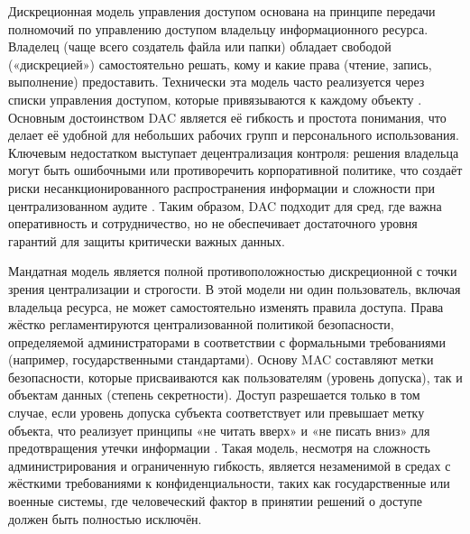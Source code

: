 \documentclass{SibFU-docs}
\begin{document}

Дискреционная модель управления доступом основана на принципе передачи полномочий по управлению доступом владельцу информационного ресурса. Владелец (чаще всего создатель файла или папки) обладает свободой («дискрецией») самостоятельно решать, кому и какие права (чтение, запись, выполнение) предоставить. Технически эта модель часто реализуется через списки управления доступом, которые привязываются к каждому объекту \cite{cleverence_comparison_2025}. Основным достоинством DAC является её гибкость и простота понимания, что делает её удобной для небольших рабочих групп и персонального использования. Ключевым недостатком выступает децентрализация контроля: решения владельца могут быть ошибочными или противоречить корпоративной политике, что создаёт риски несанкционированного распространения информации и сложности при централизованном аудите \cite{falcongaze_audit_2026}. Таким образом, DAC подходит для сред, где важна оперативность и сотрудничество, но не обеспечивает достаточного уровня гарантий для защиты критически важных данных.


Мандатная модель является полной противоположностью дискреционной с точки зрения централизации и строгости. В этой модели ни один пользователь, включая владельца ресурса, не может самостоятельно изменять правила доступа. Права жёстко регламентируются централизованной политикой безопасности, определяемой администраторами в соответствии с формальными требованиями (например, государственными стандартами). Основу MAC составляют метки безопасности, которые присваиваются как пользователям (уровень допуска), так и объектам данных (степень секретности). Доступ разрешается только в том случае, если уровень допуска субъекта соответствует или превышает метку объекта, что реализует принципы «не читать вверх» и «не писать вниз» для предотвращения утечки информации \cite{rt_solar_models_2023}. Такая модель, несмотря на сложность администрирования и ограниченную гибкость, является незаменимой в средах с жёсткими требованиями к конфиденциальности, таких как государственные или военные системы, где человеческий фактор в принятии решений о доступе должен быть полностью исключён.

\end{document}
